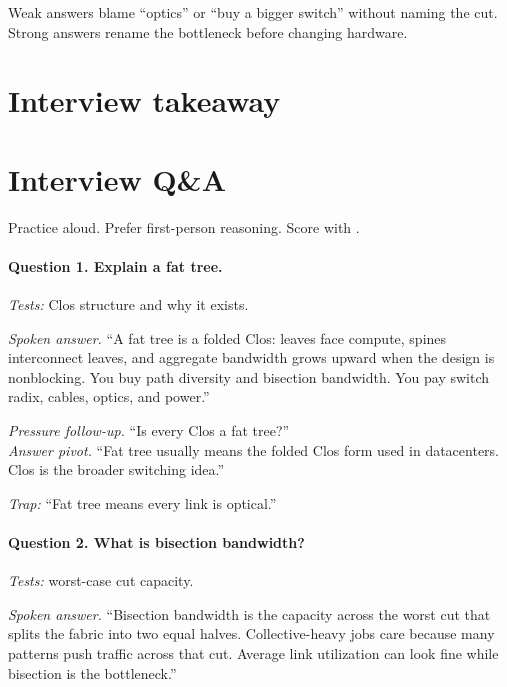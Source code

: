 Weak answers blame ``optics'' or ``buy a bigger switch'' without naming the
cut. Strong answers rename the bottleneck before changing hardware.

\section{Interview takeaway}
\label{sec:hpc-design-review}


\section{Interview Q\&A}
\label{sec:hpc-interview-qa}

Practice aloud. Prefer first-person reasoning. Score with
.

\paragraph{Question 1. Explain a fat tree.}
\textit{Tests:} Clos structure and why it exists.

\textit{Spoken answer.}
``A fat tree is a folded Clos: leaves face compute, spines interconnect leaves,
and aggregate bandwidth grows upward when the design is nonblocking. You buy
path diversity and bisection bandwidth. You pay switch radix, cables, optics,
and power.''

\textit{Pressure follow-up.} ``Is every Clos a fat tree?''\\
\textit{Answer pivot.} ``Fat tree usually means the folded Clos form used in
datacenters. Clos is the broader switching idea.''

\textit{Trap:} ``Fat tree means every link is optical.''

\paragraph{Question 2. What is bisection bandwidth?}
\textit{Tests:} worst-case cut capacity.

\textit{Spoken answer.}
``Bisection bandwidth is the capacity across the worst cut that splits the
fabric into two equal halves. Collective-heavy jobs care because many patterns
push traffic across that cut. Average link utilization can look fine while
bisection is the bottleneck.''

